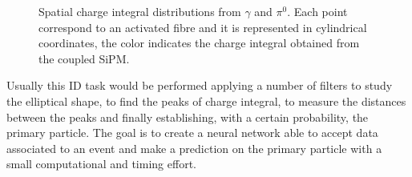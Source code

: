 \begin{figure}
	\centering
	 \quad
	\caption{Spatial charge integral distributions from $\gamma$ and $\pi^0$. Each point correspond to an activated fibre and it is represented in cylindrical coordinates, the color indicates the charge integral obtained from the coupled SiPM.}
	\label{fig:demo_shower}
\end{figure}


Usually this ID task would be performed applying a number of filters to study the elliptical shape, to find the peaks of charge integral, to measure the distances between the peaks and finally establishing, with a certain probability, the primary particle. The goal is to create a neural network able to accept data associated to an event and make a prediction on the primary particle with a small computational and timing effort.\\

